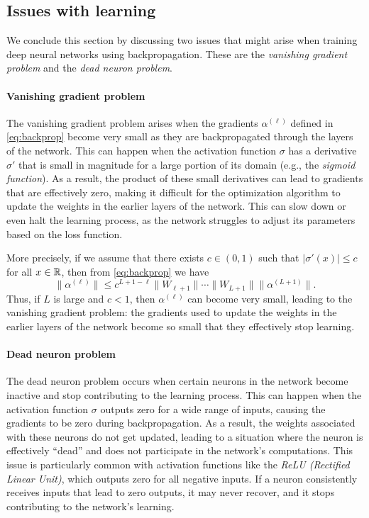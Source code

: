 \subsection{Issues with learning}
\label{sec:issues-learning}

We conclude this section by discussing two issues that might arise when training deep neural networks using backpropagation.
These are the \emph{vanishing gradient problem} and the \emph{dead neuron problem}.

\paragraph{Vanishing gradient problem}
The vanishing gradient problem arises when the gradients $\alpha^{(\ell)}$ defined in \eqref{eq:backprop} become very small as they are backpropagated through the layers of the network.
This can happen when the activation function $\sigma$ has a derivative $\sigma'$ that is small in magnitude for a large portion of its domain (e.g., the \emph{sigmoid function}).
As a result, the product of these small derivatives can lead to gradients that are effectively zero, making it difficult for the optimization algorithm to update the weights in the earlier layers of the network.
This can slow down or even halt the learning process, as the network struggles to adjust its parameters based on the loss function.

More precisely, if we assume that there exists $c\in (0,1)$ such that $|\sigma'(x)|\le c$ for all $x\in \mathbb{R}$, then from \eqref{eq:backprop} we have
\begin{equation}
    \|\alpha^{(\ell)}\| \le c^{L+1-\ell} \|W_{\ell+1}\| \cdots \|W_{L+1}\| \|\alpha^{(L+1)}\|.
\end{equation}
Thus, if $L$ is large and $c<1$, then $\alpha^{(\ell)}$ can become very small, leading to the vanishing gradient problem: the gradients used to update the weights in the earlier layers of the network become so small that they effectively stop learning.

\paragraph{Dead neuron problem}
The dead neuron problem occurs when certain neurons in the network become inactive and stop contributing to the learning process.
This can happen when the activation function $\sigma$ outputs zero for a wide range of inputs, causing the gradients to be zero during backpropagation.
As a result, the weights associated with these neurons do not get updated, leading to a situation where the neuron is effectively ``dead'' and does not participate in the network's computations.
This issue is particularly common with activation functions like the \emph{ReLU (Rectified Linear Unit)}, which outputs zero for all negative inputs.
If a neuron consistently receives inputs that lead to zero outputs, it may never recover, and it stops contributing to the network's learning.  

